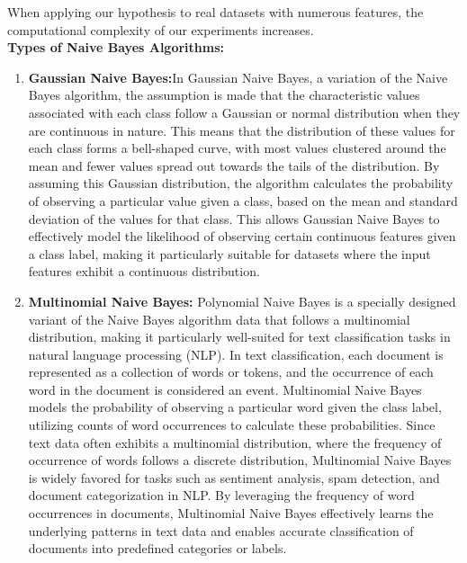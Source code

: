 When applying our hypothesis to real datasets with numerous features, the computational complexity of our experiments increases.
\\
\textbf{Types of Naive Bayes Algorithms:}
\begin{enumerate}
    \item  \textbf{Gaussian Naive Bayes:}In Gaussian Naive Bayes, a variation of the Naive Bayes algorithm, the assumption is made that the characteristic values associated with each class follow a Gaussian or normal distribution when they are continuous in nature. This means that the distribution of these values for each class forms a bell-shaped curve, with most values clustered around the mean and fewer values spread out towards the tails of the distribution. By assuming this Gaussian distribution, the algorithm calculates the probability of observing a particular value given a class, based on the mean and standard deviation of the values for that class. This allows Gaussian Naive Bayes to effectively model the likelihood of observing certain continuous features given a class label, making it particularly suitable for datasets where the input features exhibit a continuous distribution.
\item \textbf{Multinomial Naive Bayes:} Polynomial Naive Bayes is a specially designed variant of the Naive Bayes algorithm data that follows a multinomial distribution, making it particularly well-suited for text classification tasks in natural language processing (NLP). In text classification, each document is represented as a collection of words or tokens, and the occurrence of each word in the document is considered an event. Multinomial Naive Bayes models the probability of observing a particular word given the class label, utilizing counts of word occurrences to calculate these probabilities. Since text data often exhibits a multinomial distribution, where the frequency of occurrence of words follows a discrete distribution, Multinomial Naive Bayes is widely favored for tasks such as sentiment analysis, spam detection, and document categorization in NLP. By leveraging the frequency of word occurrences in documents, Multinomial Naive Bayes effectively learns the underlying patterns in text data and enables accurate classification of documents into predefined categories or labels.

\end{enumerate}
